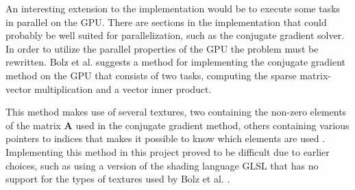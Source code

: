An interesting extension to the implementation would be to execute some tasks in parallel on the GPU. There are sections in the implementation that could probably be well suited for parallelization, such as the conjugate gradient solver. In order to utilize the parallel properties of the GPU the problem must be rewritten. Bolz et al. \cite{gpu} suggests a method for implementing the conjugate gradient method on the GPU that consists of two tasks, computing the sparse matrix-vector multiplication and a vector inner product.

This method makes use of several textures, two containing the non-zero elements of the matrix $\mathbf{A}$ used in the conjugate gradient method, others containing various pointers to indices that makes it possible to know which elements are used . Implementing this method in this project proved to be difficult due to earlier choices, such as using a version of the shading language GLSL that has no support for the types of textures used by Bolz et al. \cite{gpu}. 
